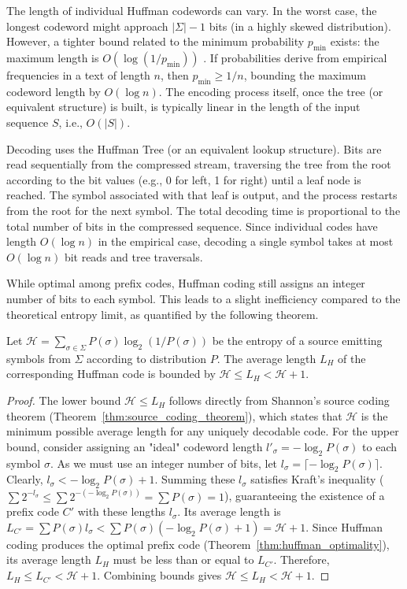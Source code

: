 The length of individual Huffman codewords can vary. In the worst case, the longest codeword might approach $|\Sigma|-1$ bits (in a highly skewed distribution). However, a tighter bound related to the minimum probability $p_{\min}$ exists: the maximum length is $O(\log(1/p_{\min}))$ \cite{navarro2016compact}. If probabilities derive from empirical frequencies in a text of length $n$, then $p_{\min} \ge 1/n$, bounding the maximum codeword length by $O(\log n)$. The encoding process itself, once the tree (or equivalent structure) is built, is typically linear in the length of the input sequence $S$, i.e., $O(|S|)$.

Decoding uses the Huffman Tree (or an equivalent lookup structure). Bits are read sequentially from the compressed stream, traversing the tree from the root according to the bit values (e.g., 0 for left, 1 for right) until a leaf node is reached. The symbol associated with that leaf is output, and the process restarts from the root for the next symbol. The total decoding time is proportional to the total number of bits in the compressed sequence. Since individual codes have length $O(\log n)$ in the empirical case, decoding a single symbol takes at most $O(\log n)$ bit reads and tree traversals.

While optimal among prefix codes, Huffman coding still assigns an integer number of bits to each symbol. This leads to a slight inefficiency compared to the theoretical entropy limit, as quantified by the following theorem.

\begin{theorem} \label{thm:huffman_bounds}
    Let $\mathcal{H} = \sum_{\sigma \in \Sigma} P(\sigma)\log_2(1/P(\sigma))$ be the entropy of a source emitting symbols from $\Sigma$ according to distribution $P$. The average length $L_H$ of the corresponding Huffman code is bounded by $\mathcal{H} \le L_H < \mathcal{H} + 1$.
\end{theorem}
\begin{proof}
    The lower bound $\mathcal{H} \le L_H$ follows directly from Shannon's source coding theorem (Theorem~\ref{thm:source_coding_theorem}), which states that $\mathcal{H}$ is the minimum possible average length for any uniquely decodable code.
    For the upper bound, consider assigning an "ideal" codeword length $l'_\sigma = -\log_2 P(\sigma)$ to each symbol $\sigma$. As we must use an integer number of bits, let $l_\sigma = \lceil -\log_2 P(\sigma) \rceil$. Clearly, $l_\sigma < -\log_2 P(\sigma) + 1$. Summing these $l_\sigma$ satisfies Kraft's inequality ($\sum 2^{-l_\sigma} \le \sum 2^{-(-\log_2 P(\sigma))} = \sum P(\sigma) = 1$), guaranteeing the existence of a prefix code $C'$ with these lengths $l_\sigma$. Its average length is $L_{C'} = \sum P(\sigma) l_\sigma < \sum P(\sigma) (-\log_2 P(\sigma) + 1) = \mathcal{H} + 1$. Since Huffman coding produces the optimal prefix code (Theorem~\ref{thm:huffman_optimality}), its average length $L_H$ must be less than or equal to $L_{C'}$. Therefore, $L_H \le L_{C'} < \mathcal{H} + 1$. Combining bounds gives $\mathcal{H} \le L_H < \mathcal{H} + 1$. \qedhere
\end{proof}

